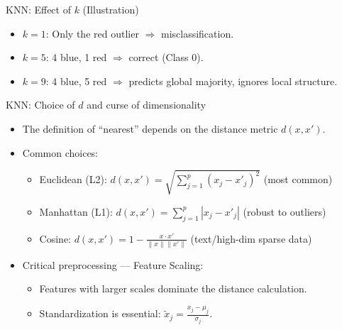 \documentclass[aspectratio=169]{beamer}
\newcommand{\1}{\mathbf{1}}
\begin{document}
\begin{frame}{KNN: Effect of $k$ (Illustration)}
    
    \vspace{0.3em}
    \small
    \begin{itemize}
        \item $k=1$: Only the red outlier $\Rightarrow$ misclassification.
        \item $k=5$: 4 blue, 1 red $\Rightarrow$ correct (Class 0).
        \item $k=9$: 4 blue, 5 red $\Rightarrow$ predicts global majority, ignores local structure.
    \end{itemize}
\end{frame}




\begin{frame}{KNN: Choice of $d$ and curse of dimensionality}
    \small
    \begin{itemize}
    \item The definition of ``nearest'' depends on the distance metric $d(x, x')$.
    
    \item Common choices:
    \begin{itemize}
        \item Euclidean (L2): $d(x, x') = \sqrt{\sum_{j=1}^{p} (x_j - x'_j)^2}$ \quad (most common)
        \item Manhattan (L1): $d(x, x') = \sum_{j=1}^{p} |x_j - x'_j|$ \quad (robust to outliers)
        \item Cosine: $d(x, x') = 1 - \frac{x \cdot x'}{\|x\| \|x'\|}$ \quad (text/high-dim sparse data)
    \end{itemize}
    \item Critical preprocessing — Feature Scaling:
    \begin{itemize}
        \item Features with larger scales dominate the distance calculation.
        \item Standardization is essential: $\tilde{x}_j = \frac{x_j - \mu_j}{\sigma_j}$.
    \end{itemize}
    \end{itemize}
\end{frame}
\end{document}
